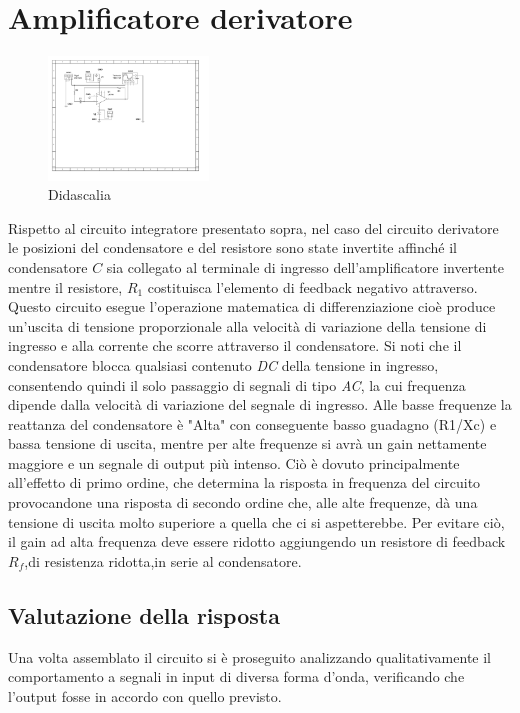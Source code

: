 \documentclass[journal]{IEEEtran}
\begin{document}
\section{Amplificatore derivatore} %
\begin{figure}[H]%
\begin {center}
\includegraphics[width=0.38\textwidth]{sch-simulations/output/OPA-deriv.pdf}
\caption{Didascalia}
\label{fig:OPA-deriv}
\end {center}
\end{figure}
Rispetto al circuito integratore presentato sopra, nel caso del circuito derivatore le posizioni del condensatore e del resistore sono state invertite affinché il condensatore $C$ sia collegato al terminale di ingresso dell'amplificatore invertente mentre il resistore, $R_1$ costituisca l'elemento di feedback negativo attraverso. Questo circuito esegue l'operazione matematica di differenziazione cioè produce un'uscita di tensione proporzionale alla velocità di variazione della tensione di ingresso e alla corrente che scorre attraverso il condensatore. Si noti che il condensatore blocca qualsiasi contenuto \textit{DC} della tensione in ingresso, consentendo  quindi il solo passaggio di segnali di tipo \textit{AC}, la cui frequenza dipende dalla velocità di variazione del segnale di ingresso. Alle basse frequenze la reattanza del condensatore è "Alta" con conseguente basso guadagno (R1/Xc) e bassa tensione di uscita, mentre per alte frequenze si avrà un gain nettamente maggiore e un segnale di output più intenso. Ciò è dovuto principalmente all'effetto di primo ordine, che determina la risposta in frequenza del circuito provocandone una risposta di secondo ordine che, alle alte frequenze, dà una tensione di uscita molto superiore a quella che ci si aspetterebbe. Per evitare ciò, il gain ad alta frequenza deve essere ridotto aggiungendo un resistore di feedback $R_f$,di resistenza ridotta,in serie al condensatore. 
\subsection{\textbf{Valutazione della risposta}}
Una volta assemblato il circuito si è proseguito analizzando qualitativamente il comportamento a segnali in input di diversa forma d'onda, verificando che l'output fosse in accordo con quello previsto.
\end{document}
